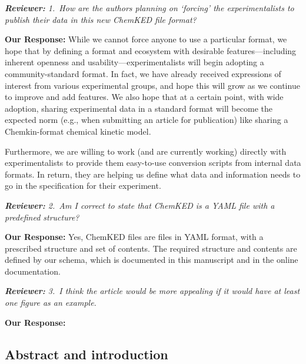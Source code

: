 \documentclass[a4paper,10pt]{elsarticle}
\newenvironment{reviewer}{\vspace{0.5\baselineskip}\begingroup\itshape\textbf{Reviewer:}}{\endgroup}
\newenvironment{response}{\textbf{Our Response:}}{\vspace{0.5\baselineskip}}
\begin{document}
\begin{reviewer}
    1.~How are the authors planning on `forcing' the experimentalists to publish their data in this
    new ChemKED file format?
\end{reviewer}

\begin{response}
    While we cannot force anyone to use a particular format, we hope that by defining a format and
    ecosystem with desirable features---including inherent openness and usability---experimentalists
    will begin adopting a community-standard format. In fact, we have already received expressions
    of interest from various experimental groups, and hope this will grow as we continue to improve
    and add features. We also hope that at a certain point, with wide adoption, sharing experimental
    data in a standard format will become the expected norm (e.g., when submitting an article for
    publication) like sharing a Chemkin-format chemical kinetic model.

    Furthermore, we are willing to work (and are currently working) directly with experimentalists
    to provide them easy-to-use conversion scripts from internal data formats. In return, they are
    helping us define what data and information needs to go in the specification for their
    experiment.
\end{response}

\begin{reviewer}
    2.~Am I correct to state that ChemKED is a YAML file with a predefined structure?
\end{reviewer}

\begin{response}
    Yes, ChemKED files are files in YAML format, with a prescribed structure and set of contents.
    The required structure and contents are defined by our schema, which is documented in this
    manuscript and in the online documentation.
\end{response}

\begin{reviewer}
    3.~I think the article would be more appealing if it would have at least one figure as an
    example.
\end{reviewer}

\begin{response}

\end{response}

\subsection*{Abstract and introduction}
\end{document}
